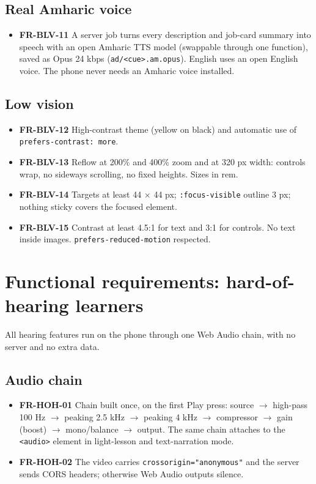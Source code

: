 \documentclass[11pt,a4paper]{article}
\newcommand{\code}[1]{\texttt{#1}}
\newcommand{\req}[1]{\textbf{#1}}
\begin{document}
\subsection{Real Amharic voice}
\begin{itemize}
  \item \req{FR-BLV-11} A server job turns every description and job-card summary into speech with an open Amharic TTS model (swappable through one function), saved as Opus 24 kbps (\code{ad/<cue>.am.opus}). English uses an open English voice. The phone never needs an Amharic voice installed.
\end{itemize}

\subsection{Low vision}
\begin{itemize}
  \item \req{FR-BLV-12} High-contrast theme (yellow on black) and automatic use of \code{prefers-contrast: more}.
  \item \req{FR-BLV-13} Reflow at 200\% and 400\% zoom and at 320 px width: controls wrap, no sideways scrolling, no fixed heights. Sizes in rem.
  \item \req{FR-BLV-14} Targets at least 44 $\times$ 44 px; \code{:focus-visible} outline 3 px; nothing sticky covers the focused element.
  \item \req{FR-BLV-15} Contrast at least 4.5:1 for text and 3:1 for controls. No text inside images. \code{prefers-reduced-motion} respected.
\end{itemize}

\section{Functional requirements: hard-of-hearing learners}

All hearing features run on the phone through one Web Audio chain, with no server and no extra data.

\subsection{Audio chain}
\begin{itemize}
  \item \req{FR-HOH-01} Chain built once, on the first Play press: source $\rightarrow$ high-pass 100 Hz $\rightarrow$ peaking 2.5 kHz $\rightarrow$ peaking 4 kHz $\rightarrow$ compressor $\rightarrow$ gain (boost) $\rightarrow$ mono/balance $\rightarrow$ output. The same chain attaches to the \code{<audio>} element in light-lesson and text-narration mode.
  \item \req{FR-HOH-02} The video carries \code{crossorigin="anonymous"} and the server sends CORS headers; otherwise Web Audio outputs silence.
\end{itemize}
\end{document}
